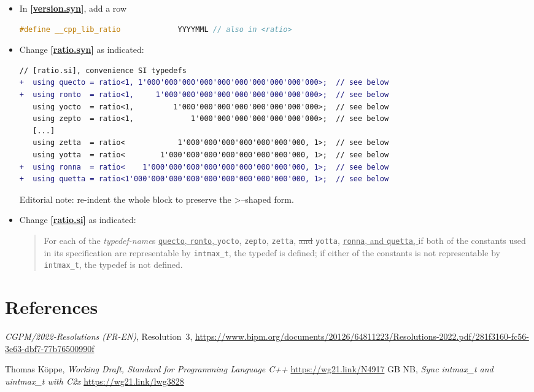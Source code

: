 \documentclass[11pt]{article}
\newcommand{\wgpaper}[1]{\href{https://wg21.link/#1}{#1}}
\newcommand{\isref}[1]{\textbf{[\wgpaper{#1}]}}
\newcommand{\intmaxt}{\texttt{intmax\_t}}
\newcommand{\quecto}{\texttt{quecto}}
\newcommand{\ronto}{\texttt{ronto}}
\newcommand{\yocto}{\texttt{yocto}}
\newcommand{\zepto}{\texttt{zepto}}
\newcommand{\zetta}{\texttt{zetta}}
\newcommand{\yotta}{\texttt{yotta}}
\newcommand{\ronna}{\texttt{ronna}}
\newcommand{\quetta}{\texttt{quetta}}
\begin{document}
\begin{itemize}
\item In \isref{version.syn}, add a row
  \begin{lstlisting}[language=C++]
    #define __cpp_lib_ratio             YYYYMML // also in <ratio>
  \end{lstlisting}
\item Change \isref{ratio.syn} as indicated:
\begin{lstlisting}[language=diff]
   // [ratio.si], convenience SI typedefs
+  using quecto = ratio<1, 1'000'000'000'000'000'000'000'000'000'000>;  // see below
+  using ronto  = ratio<1,     1'000'000'000'000'000'000'000'000'000>;  // see below
   using yocto  = ratio<1,         1'000'000'000'000'000'000'000'000>;  // see below
   using zepto  = ratio<1,             1'000'000'000'000'000'000'000>;  // see below
   [...]
   using zetta  = ratio<            1'000'000'000'000'000'000'000, 1>;  // see below
   using yotta  = ratio<        1'000'000'000'000'000'000'000'000, 1>;  // see below
+  using ronna  = ratio<    1'000'000'000'000'000'000'000'000'000, 1>;  // see below
+  using quetta = ratio<1'000'000'000'000'000'000'000'000'000'000, 1>;  // see below
\end{lstlisting}
Editorial note: re-indent the whole block to preserve the \textgreater--shaped form.
\item Change \isref{ratio.si} as indicated:
  \begin{quote}
    For each of the \textit{typedef-name}s \underline{\quecto, \ronto,
    } \yocto, \zepto, \zetta, \sout{and }\yotta, \underline{\ronna,
      and \quetta, }if both of the constants used in its specification
    are representable by \intmaxt, the typedef is defined; if either
    of the constants is not representable by \intmaxt, the typedef is
    not defined.
  \end{quote}
\end{itemize}

\section{References}
\renewcommand{\section}[2]{}%
\begin{thebibliography}{9}

    \emph{CGPM/2022-Resolutions (FR-EN)}, Resolution~3,\newline
    \url{https://www.bipm.org/documents/20126/64811223/Resolutions-2022.pdf/281f3160-fc56-3e63-dbf7-77b76500990f}

    Thomas Köppe,
    \emph{Working Draft, Standard for Programming Language C++}\newline
    \url{https://wg21.link/N4917}
    GB NB,
    \emph{Sync intmax\_t and uintmax\_t with C2x}\newline
    \url{https://wg21.link/lwg3828}

\end{thebibliography}
\end{document}
